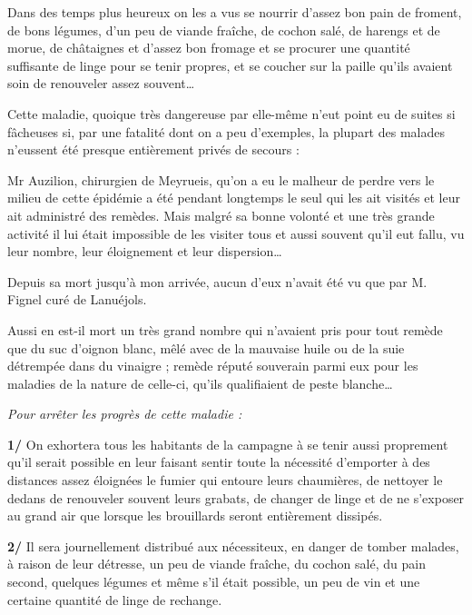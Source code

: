 

{\fontsize{10.2}{12.0}\selectfont

Dans des temps plus heureux on les a vus se nourrir d’assez bon pain de froment, de bons légumes, d’un peu de viande fraîche, de cochon salé, de harengs et de morue, de châtaignes et d’assez bon fromage et se procurer une quantité suffisante de linge pour se tenir propres, et se coucher sur la paille qu’ils avaient soin de renouveler assez souvent…

Cette maladie, quoique très dangereuse par elle-même n’eut point eu de suites si fâcheuses si, par une fatalité dont on a peu d’exemples, la plupart des malades n’eussent été presque entièrement privés de secours :

Mr Auzilion, chirurgien de Meyrueis, qu’on a eu le malheur de perdre vers le milieu de cette épidémie a été pendant longtemps le seul qui les ait visités et leur ait administré des remèdes. Mais malgré sa bonne volonté et une très grande activité il lui était impossible de les visiter tous et aussi souvent qu’il eut fallu, vu leur nombre, leur éloignement et leur dispersion…

Depuis sa mort jusqu’à mon arrivée, aucun d’eux n’avait été vu que par M. Fignel curé de Lanuéjols.

Aussi en est-il mort un très grand nombre qui n’avaient pris pour tout remède que du suc d’oignon blanc, mêlé avec de la mauvaise huile ou de la suie détrempée dans du vinaigre ; remède réputé souverain parmi eux pour les maladies de la nature de celle-ci, qu’ils qualifiaient de peste blanche…

\medskip

\textit{Pour arrêter les progrès de cette maladie :}

\medskip

\textbf{1/} On exhortera tous les habitants de la campagne à se tenir aussi proprement qu’il serait possible en leur faisant sentir toute la nécessité d’emporter à des distances assez éloignées le fumier qui entoure leurs chaumières, de nettoyer le dedans de renouveler souvent leurs grabats, de changer de linge et de ne s’exposer au grand air que lorsque les brouillards seront entièrement dissipés.

\medskip

\textbf{2/} Il sera journellement distribué aux nécessiteux, en danger de tomber malades, à raison de leur détresse, un peu de viande fraîche, du cochon salé, du pain second, quelques légumes et même s’il était possible, un peu de vin et une certaine quantité de linge de rechange.

}
